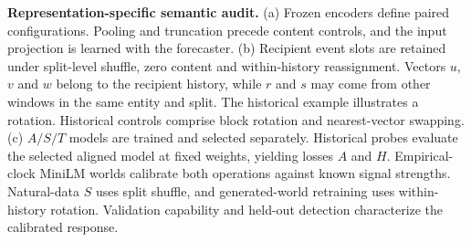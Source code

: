 \caption{\textbf{Representation-specific semantic audit.} (a) Frozen encoders define paired configurations. Pooling and truncation precede content controls, and the input projection is learned with the forecaster. (b) Recipient event slots are retained under split-level shuffle, zero content and within-history reassignment. Vectors $u$, $v$ and $w$ belong to the recipient history, while $r$ and $s$ may come from other windows in the same entity and split. The historical example illustrates a rotation. Historical controls comprise block rotation and nearest-vector swapping. (c) $A/S/T$ models are trained and selected separately. Historical probes evaluate the selected aligned model at fixed weights, yielding losses $A$ and $H$. Empirical-clock MiniLM worlds calibrate both operations against known signal strengths. Natural-data $S$ uses split shuffle, and generated-world retraining uses within-history rotation. Validation capability and held-out detection characterize the calibrated response.}
